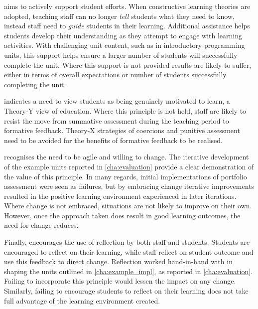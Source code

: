  aims to actively support student efforts. When constructive learning theories are adopted, teaching staff can no longer \emph{tell} students what they need to know, instead staff need to \emph{guide} students in their learning. Additional assistance helps students develop their understanding as they attempt to engage with learning activities. With challenging unit content, such as in introductory programming units, this support helps ensure a larger number of students will successfully complete the unit. Where this support is not provided results are likely to suffer, either in terms of overall expectations or number of students successfully completing the unit. 

 indicates a need to view students as being genuinely motivated to learn, a Theory-Y view of education. Where this principle is not held, staff are likely to resist the move from summative assessment during the teaching period to formative feedback. Theory-X strategies of coercions and punitive assessment need to be avoided for the benefits of formative feedback to be realised.

 recognises the need to be agile and willing to change. The iterative development of the example units reported in \cref{cha:evaluation} provide a clear demonstration of the value of this principle. In many regards, initial implementations of portfolio assessment were seen as failures, but by embracing change iterative improvements resulted in the positive learning environment experienced in later iterations. Where change is not embraced, situations are not likely to improve on their own. However, once the approach taken does result in good learning outcomes, the need for change reduces.    

Finally,  encourages the use of reflection by both staff and students. Students are encouraged to reflect on their learning, while staff reflect on student outcome and use this feedback to direct change. Reflection worked hand-in-hand with  in shaping the units outlined in \cref{cha:example_impl}, as reported in \cref{cha:evaluation}. Failing to incorporate this principle would lessen the impact on any change. Similarly, failing to encourage students to reflect on their learning does not take full advantage of the learning environment created.


